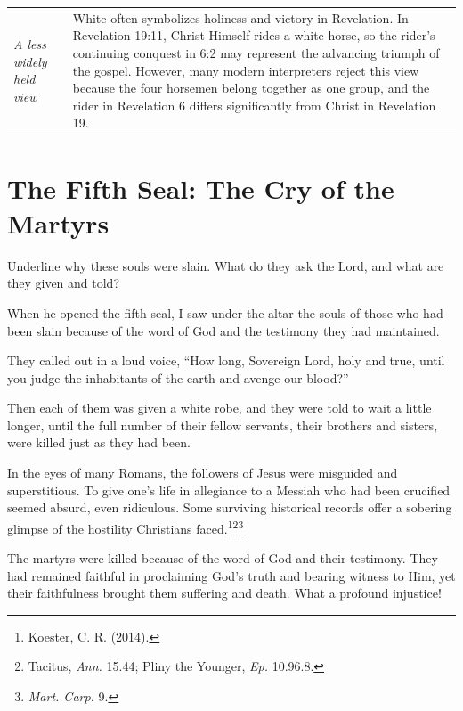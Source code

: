 {\begin{longtable}{>{\raggedright\arraybackslash}p{2.9cm}|
                  >{\raggedright\arraybackslash}p{6.7cm}}
\smallskip
\textit{A less widely held view} &
White often symbolizes holiness and victory in Revelation. In Revelation 19:11, Christ Himself rides a white horse\index{white horse}, so the rider's continuing conquest in 6:2 may represent the advancing triumph of the gospel. However, many modern interpreters reject this view because the four horsemen belong together as one group, and the rider in Revelation 6 differs significantly from Christ in Revelation 19. \\
\end{longtable}
}

\section{The Fifth Seal: The Cry of the Martyrs}


\begin{ScriptureBox2}{Underline why these souls were slain. What do they ask the Lord, and what are they given and told?}

\item[6:9] When he opened the fifth seal, I saw under the altar the souls of those who had been slain because of the word of God and the testimony they had maintained.

\item[6:10] They called out in a loud voice, ``How long, Sovereign Lord, holy and true, until you judge the inhabitants of the earth and avenge our blood?''

\item[6:11] Then each of them was given a white robe, and they were told to wait a little longer, until the full number of their fellow servants, their brothers and sisters, were killed just as they had been.

\end{ScriptureBox2}

In the eyes of many Romans, the followers of Jesus were misguided and superstitious. To give one's life in allegiance to a Messiah who had been crucified seemed absurd, even ridiculous. Some surviving historical records offer a sobering glimpse of the hostility Christians faced.\footnote{Koester, C. R. (2014).}\footnote{Tacitus, \textit{Ann.} 15.44; Pliny the Younger, \textit{Ep.} 10.96.8.}\footnote{\textit{Mart. Carp.} 9.}

The martyrs were killed because of the word of God and their testimony. They had remained faithful in proclaiming God's truth and bearing witness to Him, yet their faithfulness brought them suffering and death. What a profound injustice!

